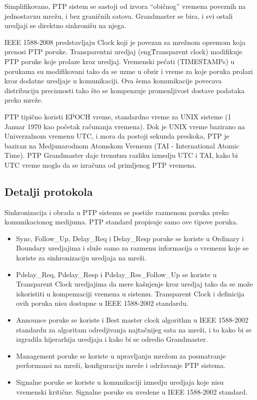 \documentclass[a4paper,12pt, master]{etf}
\begin{document}
    Simplifikovano, PTP sistem se sastoji od izvora ``obi\v{c}nog'' vremena
    poveznih na jednostavnu mre\v{z}u, i bez grani\v{c}nih satova. Grandmaster
    se bira, i svi ostali uredjaji se direktno sinhroni\v{s}u na njega.

	IEEE 1588-2008 predstavljaju Clock koji je povezan sa mre\v{z}nom opremom
    koja prenosi PTP poruke.  Transparentni uredjaj (eng\. Transparent clock)
	modifikuje PTP poruke koje prolaze kroz uredjaj. Vremenski pe\v{c}ati
	(TIMESTAMPs) u porukama su modifikovani tako da se uzme u obzir i vreme za
	koje poruka prolazi kroz dodatne uredjaje u komunikaciji. Ova \v{s}ema
	komunikacije povecava distribuciju preciznosti tako \v{s}to se kompenzuje
	promenljivost dostave podataka preko mre\v{z}e.

	PTP tipi\v{c}no koristi EPOCH vreme, standardno vreme za UNIX sisteme (1
	Januar 1970 kao po\v{c}etak ra\v{c}unanja vremena). Dok je UNIX vreme
	bazirano na Univerzalnom vremenu UTC, i mora da postoji sekunda preskoka,
    PTP je baziran na Medjunarodnom Atomskom Vremenu (TAI - International Atomic
    Time). PTP Grandmaster daje trenutnu razliku izmedju UTC i TAI, kako bi UTC
    vreme moglo da se izra\v{c}una od primljenog PTP vremena.

	\subsection{Detalji protokola}

	Sinhronizacija i obrada u PTP sistemu se posti\v{z}e razmenom poruka preko
	komunikacionog medijuma. PTP standard propisuje samo ove tipove poruka.

	\begin{itemize}
		\item Sync, Follow\_Up, Delay\_Req i Delay\_Resp poruke se koriste u
		Ordinary i Boundary uredjajima i slu\v{z}e samo za razmenu informacija
		o vremenu koje se koriste za sinhronizaciju uredjaja na mre\v{z}i.
		\item Pdelay\_Req, Pdelay\_Resp i Pdelay\_Res\_Follow\_Up se koriste u
		Transparent Clock uredjajima da mere ka\v{s}njenje kroz uredjaj tako da
		se mo\v{z}e iskoristiti u kompenzaciji vremena u sistemu. Transparent
		Clock i definicija ovih poruka nisu dostupne u IEEE 1588-2002 standardu.
		\item Announce poruke se koriste i Best master clock algorithm u IEEE
		1588-2002 standardu za algoritam odredjivanja najta\v{c}nijeg sata na
		mre\v{z}i, i to kako bi se izgradila hijerarhija uredjaja i kako bi se
		odredio Grandmaster.
		\item Management poruke se koriste u upravljanju mre\v{z}om za
		posmatranje performansi na mre\v{z}i, konfiguraciju mre\v{z}e i
		odr\v{z}avanje PTP sistema.
		\item Signalne poruke se koriste u komunikaciji izmedju uredjaja koje
		nisu vremenski kriti\v{c}ne. Signalne poruke su uvedene u IEEE
		1588-2002 standard.
	\end{itemize}
\end{document}

